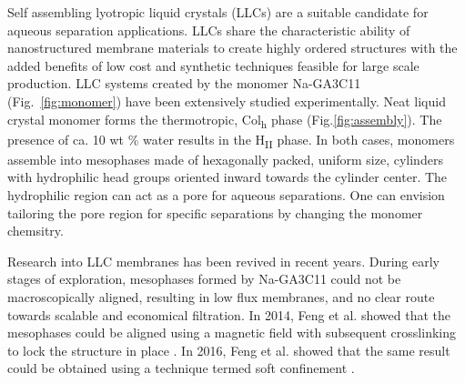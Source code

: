 \documentclass{article}
\begin{document}
  Self assembling lyotropic liquid crystals (LLCs) are a suitable candidate for
  aqueous separation applications. LLCs share the characteristic ability of
  nanostructured membrane materials to create highly ordered structures with the
  added benefits of low cost and synthetic techniques feasible for large scale
  production.  \cite{feng_scalable_2014} LLC systems created by the monomer 
  Na-GA3C11 (Fig.~\ref{fig:monomer}) have been extensively studied experimentally.
  \cite{smith_ordered_1997,zhou_supported_2005,resel_h2-phase_2000,feng_scalable_2014,feng_thin_2016}
  Neat liquid crystal monomer forms the thermotropic, Col\textsubscript{h}
  phase (Fig.\ref{fig:assembly}). The presence of ca. 10 wt \% water results in the
  H\textsubscript{II} phase. In both cases, monomers assemble into mesophases
  made of hexagonally packed, uniform size, cylinders with hydrophilic head
  groups oriented inward towards the cylinder center.  The hydrophilic region can
  act as a pore for aqueous separations.  One can envision tailoring the pore
  region for specific separations by changing the monomer chemsitry.

  Research into LLC membranes has been revived in recent years. During early
  stages of exploration, mesophases formed by Na-GA3C11 could not be
  macroscopically aligned, resulting in low flux membranes, and no clear route
  towards scalable and economical filtration. In 2014, Feng et al. showed that
  the mesophases could be aligned using a magnetic field with subsequent
  crosslinking to lock the structure in place \cite{feng_scalable_2014}. In 2016,
  Feng et al. showed that the same result could be obtained using a technique
  termed soft confinement \cite{feng_thin_2016}.

\end{document}

